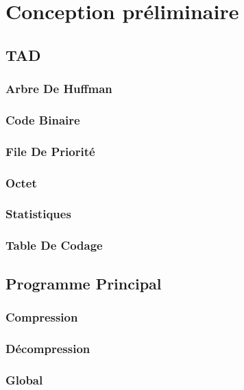\documentclass{article}
\begin{document}
\section{Conception préliminaire}
\subsection{TAD}
\subsubsection{Arbre De Huffman}
	
\subsubsection{Code Binaire}
	
\subsubsection{File De Priorité}
	
\subsubsection{Octet}
	
\subsubsection{Statistiques}
	
\subsubsection{Table De Codage}
	
\subsection{Programme Principal}
\subsubsection{Compression}
	
\subsubsection{Décompression}
	
\subsubsection{Global}
	
	
\end{document}

